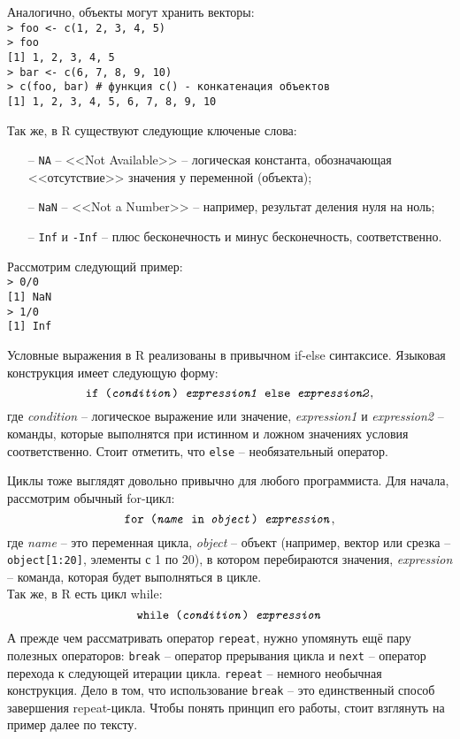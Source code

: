     Аналогично, объекты могут хранить векторы: \\
    \indent \texttt{> foo <- c(1, 2, 3, 4, 5)} \\
    \indent \texttt{> foo} \\
    \indent \texttt{[1] 1, 2, 3, 4, 5} \\
    \indent \texttt{> bar <- c(6, 7, 8, 9, 10)} \\
    \indent \texttt{> c(foo, bar) \# функция c() - конкатенация объектов} \\
    \indent \texttt{[1] 1, 2, 3, 4, 5, 6, 7, 8, 9, 10} 

    Так же, в R существуют следующие ключеные слова:
    \begin{itemize}
        \item[--] \texttt{NA} -- <<Not Available>> -- логическая константа, обозначающая
            <<отсутствие>> значения у переменной (объекта);
        \item[--] \texttt{NaN} -- <<Not a Number>> -- например, результат деления нуля на 
            ноль;
        \item[--] \texttt{Inf} и \texttt{-Inf} -- плюс бесконечность и минус бесконечность,
            соответственно.
    \end{itemize}

    Рассмотрим следующий пример:\\
    \indent\texttt{> 0/0} \\
    \indent\texttt{[1] NaN} \\
    \indent\texttt{> 1/0} \\
    \indent\texttt{[1] Inf}



    Условные выражения в R реализованы в привычном if-else синтаксисе. Языковая конструкция
    имеет следующую форму:  
    $$ \texttt{if (\textit{condition}) \textit{expression1} else \textit{expression2}}, $$
    где \textit{condition} -- логическое выражение или значение, \textit{expression1} и 
    \textit{expression2} -- команды, которые выполнятся при истинном и ложном значениях 
    условия соответственно. Стоит отметить, что \texttt{else} -- необязательный оператор.

    Циклы тоже выглядят довольно привычно для любого программиста. Для начала, рассмотрим
    обычный for-цикл: 
    $$ \texttt{for (\textit{name} in \textit{object}) \textit{expression}}, $$
    где \textit{name} -- это переменная цикла, \textit{object} -- объект (например, вектор
    или срезка -- \texttt{object[1:20]}, элементы с 1 по 20), в котором перебираются 
    значения, \textit{expression} -- команда, которая будет выполняться в цикле. \\
    Так же, в R есть цикл while:
    $$ \texttt{while (\textit{condition}) \textit{expression}} $$
    \indent А прежде чем рассматривать оператор \texttt{repeat}, нужно упомянуть ещё пару 
    полезных операторов: \texttt{break} -- оператор прерывания цикла и \texttt{next} -- 
    оператор перехода к следующей итерации цикла. \texttt{repeat} -- немного необычная 
    конструкция. Дело в том, что использование \texttt{break} -- это единственный способ
    завершения repeat-цикла. Чтобы понять принцип его работы, стоит взглянуть на пример
    далее по тексту.

